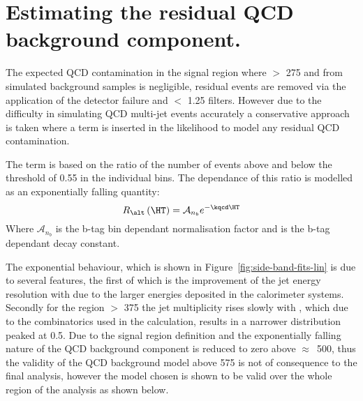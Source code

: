 


\section{Estimating the residual QCD background 
component.} %
\label{sec:estimating_the_residual_qcd_background_component_}
The expected QCD contamination in the signal region where \HT $>$
\unit{275}{\GeV} and \altg from simulated background samples is 
negligible\cite{CMS-AN-11-517}, residual events are removed via the application 
of the detector failure and \Rmiss $<$ 1.25 filters. However due to the 
difficulty in simulating QCD multi-jet events accurately a conservative 
approach is taken where a term is inserted in the likelihood to model any 
residual QCD contamination.

The term is based on the ratio of the number of events above and below the \alt 
threshold of 0.55 in the individual \HT bins. The dependance of this ratio is 
modelled as an exponentially falling quantity:
\begin{equation}
  R_{\alt}\left(\HT\right)=\mathcal{A}_{n_{b}}e^{-\kqcd\HT}
\end{equation}
Where $\mathcal{A}_{n_{b}}$ is the b-tag bin dependant normalisation factor and 
\kqcd is the b-tag dependant decay constant.

The exponential behaviour, which is shown in 
Figure~\ref{fig:side-band-fits-lin} is due to several features, the first of 
which is the improvement of the jet energy resolution with \HT due to the 
larger energies deposited in the calorimeter systems. Secondly for the region 
\HT $>$ \unit{375}{\GeV} the jet multiplicity rises slowly with \HT, which due 
to the combinatorics  used in the \alt calculation, results in a narrower \alt 
distribution peaked at 0.5. Due to the signal region definition and the 
exponentially falling nature of the QCD background component is reduced to zero 
above $\approx$~\unit{500}{\GeV}, thus the validity of the QCD background model 
above \unit{575}{\GeV} is not of consequence to the final analysis, however the 
model chosen is shown to be valid over the whole \HT region of the analysis as 
shown below.

